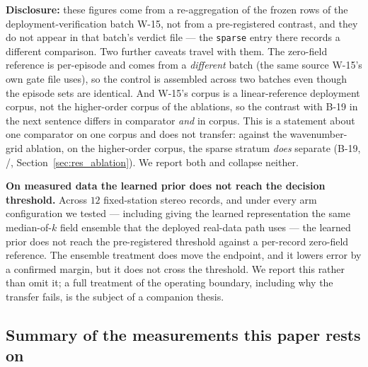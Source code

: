 \documentclass[review]{elsarticle}
\begin{document}
\textbf{Disclosure:} these figures come from a re-aggregation of the frozen rows
of the deployment-verification batch W-15, not from a pre-registered contrast, and
they do not appear in that batch's verdict file --- the \texttt{sparse} entry there
records a different comparison. Two further caveats travel with them. The zero-field
reference is per-episode and comes from a \emph{different} batch (the same source
W-15's own gate file uses), so the control is assembled across two batches even
though the episode sets are identical. And W-15's corpus is a linear-reference
deployment corpus, not the higher-order corpus of the ablations, so the contrast with
B-19 in the next sentence differs in comparator \emph{and} in corpus.
This is a statement about one
comparator on one corpus and does not transfer: against the wavenumber-grid ablation,
on the higher-order corpus, the sparse stratum \emph{does} separate (B-19,
\BNineteenBetter{}/\BNineteenN{}, Section~\ref{sec:res_ablation}). We report both and
collapse neither.

\textbf{On measured data the learned prior does not reach the decision
threshold.} Across $12$
fixed-station stereo records, and under every arm configuration we tested --- including
giving the learned representation the same median-of-$k$ field ensemble that the
deployed real-data path uses --- the learned prior does not reach the pre-registered
threshold against a per-record zero-field reference. The ensemble treatment does move
the endpoint, and it lowers error by a confirmed margin, but it does not cross the
threshold. We report this rather than omit it; a full treatment of the operating
boundary, including why the transfer fails, is the subject of a companion thesis.


\subsection{Summary of the measurements this paper rests on}
\label{sec:res_summary}
\end{document}
